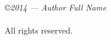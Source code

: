 \thispagestyle{empty}

\vspace*{3in}
\indent \copyright \emph{2014 --- Author Full Name}
\\~\\
\indent All rights reserved.
